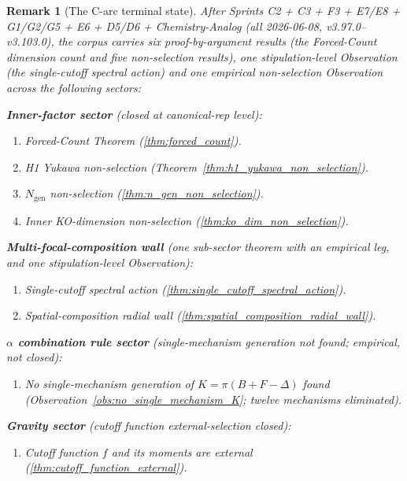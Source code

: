 \documentclass[11pt]{article}
\newtheorem{remark}{Remark}
\begin{document}

\begin{remark}[The C-arc terminal state]
\label{rem:c_arc_terminal_state}
After Sprints C2 + C3 + F3 + E7/E8 + G1/G2/G5 + E6 + D5/D6 +
Chemistry-Analog (all 2026-06-08, v3.97.0--v3.103.0), the corpus
carries \emph{six} proof-by-argument results (the Forced-Count
dimension count and five non-selection results), one stipulation-level
Observation (the single-cutoff spectral action) and one
empirical non-selection Observation across the following sectors:

\textbf{Inner-factor sector} (closed at canonical-rep level):
\begin{enumerate}\setlength{\itemsep}{1pt}
\item Forced-Count Theorem (\ref{thm:forced_count}).
\item H1 Yukawa non-selection (Theorem~\ref{thm:h1_yukawa_non_selection}).
\item $N_{\mathrm{gen}}$ non-selection (\ref{thm:n_gen_non_selection}).
\item Inner KO-dimension non-selection (\ref{thm:ko_dim_non_selection}).
\end{enumerate}

\textbf{Multi-focal-composition wall} (one sub-sector theorem with an
empirical leg, and one stipulation-level Observation):
\begin{enumerate}\setlength{\itemsep}{1pt}\setcounter{enumi}{4}
\item Single-cutoff spectral action (\ref{thm:single_cutoff_spectral_action}).
\item Spatial-composition radial wall (\ref{thm:spatial_composition_radial_wall}).
\end{enumerate}

\textbf{$\alpha$ combination rule sector} (single-mechanism
generation not found; empirical, not closed):
\begin{enumerate}\setlength{\itemsep}{1pt}\setcounter{enumi}{6}
\item No single-mechanism generation of $K = \pi(B + F - \Delta)$ found
  (Observation~\ref{obs:no_single_mechanism_K}; twelve mechanisms
  eliminated).
\end{enumerate}

\textbf{Gravity sector} (cutoff function external-selection closed):
\begin{enumerate}\setlength{\itemsep}{1pt}\setcounter{enumi}{7}
\item Cutoff function $f$ and its moments are external
  (\ref{thm:cutoff_function_external}).
\end{enumerate}


\end{remark}
\end{document}
